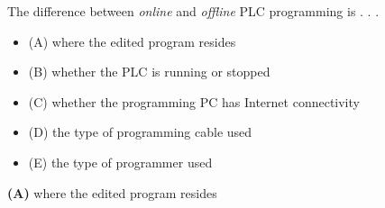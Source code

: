 

The difference between {\it online} and {\it offline} PLC programming is . . .

\begin{itemize}
\item{(A)} where the edited program resides
\vskip 5pt 
\item{(B)} whether the PLC is running or stopped
\vskip 5pt 
\item{(C)} whether the programming PC has Internet connectivity
\vskip 5pt 
\item{(D)} the type of programming cable used
\vskip 5pt 
\item{(E)} the type of programmer used
\end{itemize}







{\bf (A)} where the edited program resides
 










